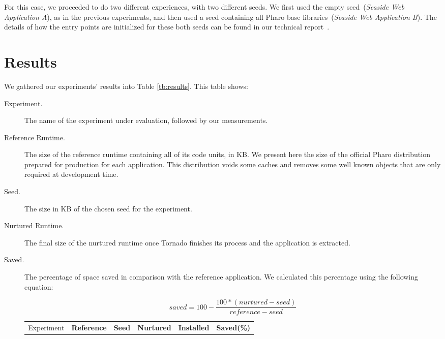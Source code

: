 For this case, we proceeded to do two different experiences, with two different seeds. We first used the empty seed~(\emph{Seaside Web Application A}), as in the previous experiments, and then used a seed containing all Pharo base libraries~(\emph{Seaside Web Application B}). The details of how the entry points are initialized for these both seeds can be found in our technical report~\cite{Poli14a}.

\section{Results} \label{sec:results_discussion}

We gathered our experiments' results into Table \ref{tb:results}. This table shows:
\begin{description}
\item[Experiment.] The name of the experiment under evaluation, followed by our measurements.
\item[Reference Runtime.] The size of the reference runtime containing all of its code units, in KB. We present here the size of the official Pharo distribution prepared for production for each application. This distribution voids some caches and removes some well known objects that are only required at development time.
\item[Seed.] The size in KB of the chosen seed for the experiment.
\item[Nurtured Runtime.] The final size of the nurtured runtime once Tornado finishes its process and the application is extracted.
\item[Saved.] The percentage of space saved in comparison with the reference application. We calculated this percentage using the following equation:

\begin{equation*}
saved = 100 - \frac{100*(nurtured - seed)}{reference - seed}
\end{equation*}

\begin{table}[ht]
 	\centering
 	\begin{tabular}{lccccc}
		\toprule
			Experiment
 			& \textbf{Reference}
			& \textbf{Seed}
			& \textbf{Nurtured}
			& \textbf{Installed}
			& \textbf{Saved(\%)}\\
			

\end{tabular}
\end{table}
\end{description}
